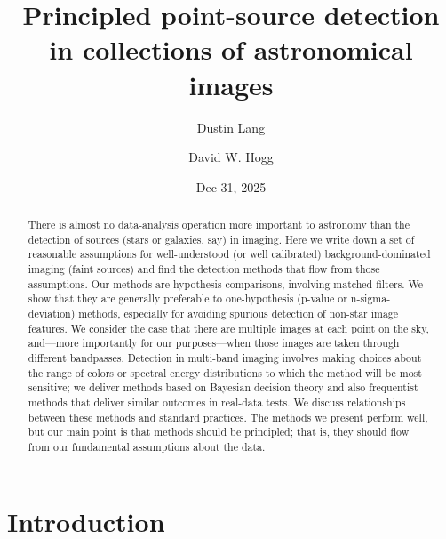 \documentclass[11pt,letterpaper,linenumbers]{aastex7}
\newcommand{\changed}[1]{#1}
\begin{document}
\title{Principled point-source detection in collections of astronomical images}
\author{Dustin Lang}
\author{David W. Hogg}
\date{Dec 31, 2025}

\begin{abstract}\noindent
  \changed{
  There is almost no data-analysis operation more important to astronomy than the detection of sources (stars or galaxies, say) in imaging.
  Here we write down a set of reasonable assumptions for well-understood (or well calibrated) background-dominated imaging (faint sources) and find the detection methods that flow from those assumptions.
  Our methods are hypothesis comparisons, involving matched filters.
  We show that they are generally preferable to one-hypothesis (p-value or n-sigma-deviation) methods, especially for avoiding spurious detection of non-star image features.
  We consider the case that there are multiple images at each point on the sky, and---more importantly for our purposes---when those images are taken through different bandpasses.
  Detection in multi-band imaging involves making choices about the range of colors or spectral energy distributions to which the method will be most sensitive; we deliver methods based on Bayesian decision theory and also frequentist methods that deliver similar outcomes in real-data tests.
  We discuss relationships between these methods and standard practices.
  The methods we present perform well, but our main point is that methods should be principled; that is, they should flow from our fundamental assumptions about the data.
  }
\end{abstract}

\section{Introduction}
\end{document}
